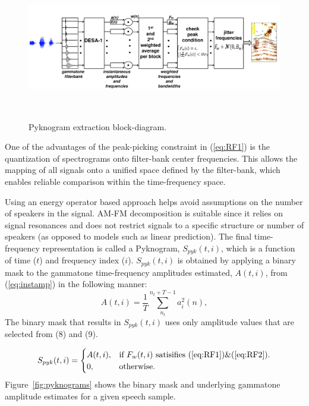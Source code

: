{\begin{figure}[t!]
	\centering
	\vspace{0mm}
	\includegraphics[height = 2.5in, width=1\textwidth]{figures/pyknogram_blockdiagram}
	\vspace{-3mm}
	\caption{Pyknogram extraction block-diagram.}
	\label{fig:pykno_blockdiag}
	\vspace{-3mm}
\end{figure}


One of the advantages of the peak-picking constraint in (\ref{eq:RF1}) is the quantization of spectrograms onto filter-bank center frequencies. 
This allows the mapping of all signals onto a unified space defined by the filter-bank, which enables reliable comparison within the time-frequency space. 

Using an energy operator based approach helps avoid assumptions on the number of speakers in the signal. 
AM-FM decomposition is suitable since it relies on signal resonances and does not restrict signals to a specific structure or number of speakers (as opposed to models such as linear prediction). 
The final time-frequency representation is called a Pyknogram, $S_{pyk}(t,i)$, which is a function of time ($t$) and frequency index ($i$). 
$S_{pyk}(t,i)$ is obtained by applying a binary mask to the gammatone time-frequency amplitudes estimated, $A(t,i)$, from (\ref{eq:instamp}) in the following manner:
\begin{equation}
\label{eq:amplitude_spectrum}
A(t,i) = \frac{1}{T}\sum_{n_t}^{n_t+T - 1}a_i^2(n),
\end{equation}
The binary mask that results in $S_{pyk}(t,i)$ uses only amplitude values that are selected from (8) and (9). 


\begin{equation}
S_{pyk}(t,i)=\begin{cases}
A(t,i), & \text{if $F_w(t,i)$ satisifies (\ref{eq:RF1})\&(\ref{eq:RF2})}.\\
0, & \text{otherwise}.
\end{cases}
\end{equation}
Figure~\ref{fig:pyknograms} shows the binary mask and underlying gammatone amplitude estimates for a given speech sample. 

}

